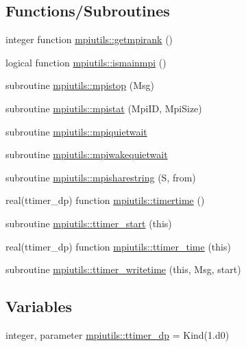 \subsection*{Functions/\+Subroutines}
\begin{DoxyCompactItemize}
\item 
integer function \mbox{\hyperlink{namespacempiutils_a10119a7c6a3093e9f38566d063e88364}{mpiutils\+::getmpirank}} ()
\item 
logical function \mbox{\hyperlink{namespacempiutils_a8c41001658ce5aafd28c17c28e215bf6}{mpiutils\+::ismainmpi}} ()
\item 
subroutine \mbox{\hyperlink{namespacempiutils_a23720e4e8b635dab4b67172618aa77e5}{mpiutils\+::mpistop}} (Msg)
\item 
subroutine \mbox{\hyperlink{namespacempiutils_af717f5183b6db768a0a9517d4737805e}{mpiutils\+::mpistat}} (Mpi\+ID, Mpi\+Size)
\item 
subroutine \mbox{\hyperlink{namespacempiutils_a81a7de07e984011ee5f1d69d403e6006}{mpiutils\+::mpiquietwait}}
\item 
subroutine \mbox{\hyperlink{namespacempiutils_a86ebeabf362ba28efbc4eae836b533bb}{mpiutils\+::mpiwakequietwait}}
\item 
subroutine \mbox{\hyperlink{namespacempiutils_a09da810020699894dfe6a3da8dd985c8}{mpiutils\+::mpisharestring}} (S, from)
\item 
real(ttimer\+\_\+dp) function \mbox{\hyperlink{namespacempiutils_a22d9c100b7422621acc997902a9856f7}{mpiutils\+::timertime}} ()
\item 
subroutine \mbox{\hyperlink{namespacempiutils_af115575f9cb5cff0693d705e9f6b4704}{mpiutils\+::ttimer\+\_\+start}} (this)
\item 
real(ttimer\+\_\+dp) function \mbox{\hyperlink{namespacempiutils_a45301d4a23c7b66f94ef24ded2062d8d}{mpiutils\+::ttimer\+\_\+time}} (this)
\item 
subroutine \mbox{\hyperlink{namespacempiutils_aec296fa19d748cab235ef01a63cdc289}{mpiutils\+::ttimer\+\_\+writetime}} (this, Msg, start)
\end{DoxyCompactItemize}
\subsection*{Variables}
\begin{DoxyCompactItemize}
\item 
integer, parameter \mbox{\hyperlink{namespacempiutils_a29264c4652e8287096a27ca2675edc26}{mpiutils\+::ttimer\+\_\+dp}} = Kind(1.d0)
\end{DoxyCompactItemize}

